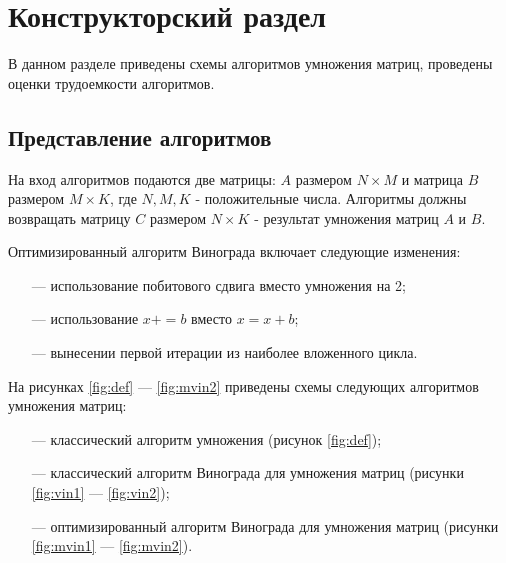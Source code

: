\chapter{Конструкторский раздел}
В данном разделе приведены схемы алгоритмов умножения матриц, проведены оценки трудоемкости алгоритмов.

\section{Представление алгоритмов}

На вход алгоритмов подаются две матрицы: $A$ размером $N\times M$ и матрица $B$ размером $M\times K$, где $N, M, K$ - положительные числа. Алгоритмы должны возвращать матрицу $C$ размером $N\times K$ - результат умножения матриц $A$ и $B$.

Оптимизированный алгоритм Винограда включает следующие изменения:
\begin{itemize}
    \item[---] использование побитового сдвига вместо умножения на 2;
    \item[---] использование $x += b$ вместо $x = x + b$;
    \item[---] вынесении первой итерации из наиболее вложенного цикла.
\end{itemize}

На рисунках \ref{fig:def} --- \ref{fig:mvin2} приведены схемы следующих алгоритмов умножения матриц:
\begin{itemize}
    \item[---] классический алгоритм умножения (рисунок \ref{fig:def});
    \item[---] классический алгоритм Винограда для умножения матриц (рисунки \ref{fig:vin1} --- \ref{fig:vin2});
    \item[---] оптимизированный алгоритм Винограда для умножения матриц (рисунки \ref{fig:mvin1} --- \ref{fig:mvin2}).
\end{itemize}

